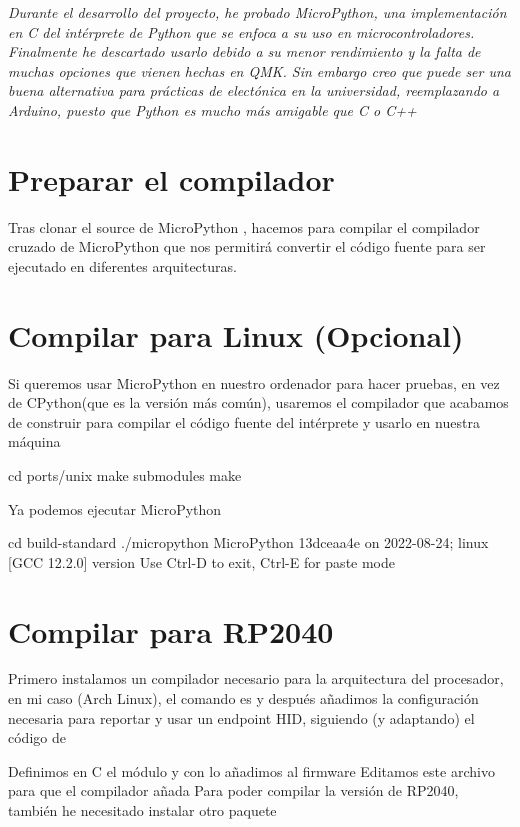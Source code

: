 {\itshape\Large Durante el desarrollo del proyecto, he probado MicroPython, una implementación en C del intérprete de Python que se enfoca a su uso en microcontroladores. Finalmente he descartado usarlo debido a su menor rendimiento y la falta de muchas opciones que vienen hechas en QMK. Sin embargo creo que puede ser una buena alternativa para prácticas de electónica en la universidad, reemplazando a Arduino, puesto que Python es mucho más amigable que C o C++}

\section{Preparar el compilador}
Tras clonar el source de MicroPython , hacemos  para compilar el compilador cruzado de MicroPython que nos permitirá convertir el código fuente para ser ejecutado en diferentes arquitecturas.

\section{Compilar para Linux (Opcional)}
Si queremos usar MicroPython en nuestro ordenador para hacer pruebas, en vez de CPython(que es la versión más común), usaremos el compilador que acabamos de construir para compilar el código fuente del intérprete y usarlo en nuestra máquina 
\begin{multicli}
  \cliarrow cd ports/unix \newline
  \cliarrow make submodules \newline
  \cliarrow make
\end{multicli}

Ya podemos ejecutar MicroPython
\begin{multicli}
  \cliarrow cd build-standard \newline
  \cliarrow ./micropython \newline
  MicroPython 13dceaa4e on 2022-08-24; linux [GCC 12.2.0] version \newline
  Use Ctrl-D to exit, Ctrl-E for paste mode
\end{multicli}

\section{Compilar para RP2040}
Primero instalamos un compilador necesario para la arquitectura del procesador, en mi caso (Arch Linux), el comando es  y después añadimos la configuración necesaria para reportar y usar un endpoint HID, siguiendo (y adaptando) el código de  \par
Definimos en C el módulo  y con  lo añadimos al firmware
Editamos este archivo para que el compilador añada 
Para poder compilar la versión de RP2040, también he necesitado instalar otro paquete \newline
{} \newline

